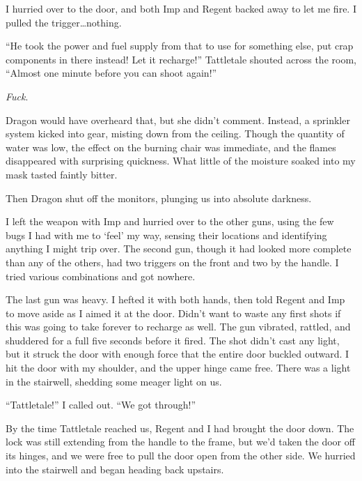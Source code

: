 I hurried over to the door, and both Imp and Regent backed away to let me fire.  I pulled the trigger\ldots nothing.



``He took the power and fuel supply from that to use for something else, put crap components in there instead!  Let it recharge!'' Tattletale shouted across the room, ``Almost one minute before you can shoot again!''



\emph{Fuck}.



Dragon would have overheard that, but she didn't comment.  Instead, a sprinkler system kicked into gear, misting down from the ceiling.  Though the quantity of water was low, the effect on the burning chair was immediate, and the flames disappeared with surprising quickness.  What little of the moisture soaked into my mask tasted faintly bitter.



Then Dragon shut off the monitors, plunging us into absolute darkness.



I left the weapon with Imp and hurried over to the other guns, using the few bugs I had with me to `feel' my way, sensing their locations and identifying anything I might trip over.  The second gun, though it had looked more complete than any of the others, had two triggers on the front and two by the handle.  I tried various combinations and got nowhere.



The last gun was heavy.  I hefted it with both hands, then told Regent and Imp to move aside as I aimed it at the door.  Didn't want to waste any first shots if this was going to take forever to recharge as well.  The gun vibrated, rattled, and shuddered for a full five seconds before it fired.  The shot didn't cast any light, but it struck the door with enough force that the entire door buckled outward.  I hit the door with my shoulder, and the upper hinge came free.  There was a light in the stairwell, shedding some meager light on us.



``Tattletale!'' I called out.  ``We got through!''



By the time Tattletale reached us, Regent and I had brought the door down.  The lock was still extending from the handle to the frame, but we'd taken the door off its hinges, and we were free to pull the door open from the other side.  We hurried into the stairwell and began heading back upstairs.




